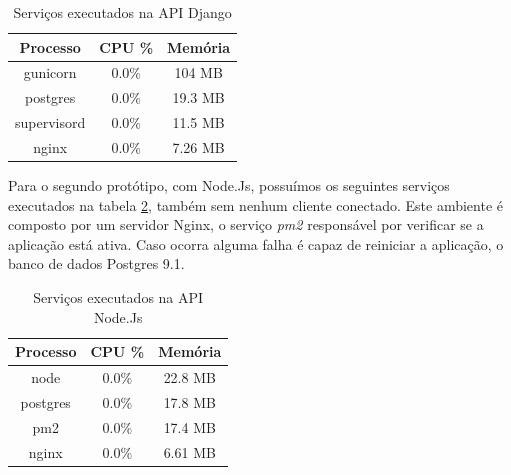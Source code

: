   \begin{table}[h]
    \centering
    \footnotesize
    \setlength{\abovecaptionskip}{0pt}
    \setlength{\belowcaptionskip}{0pt}
    \caption[Serviços executados na API Django]{Serviços executados na API Django}
    \label{tab:services-in-api-django}
    \begin{tabular}{c|c|c}
      \hline \hline
      Processo  & 	CPU \% &	Memória \\
      \hline \hline
      gunicorn &	0.0\% &		104 MB \\
      postgres &	0.0\% &		19.3 MB \\
      supervisord &	0.0\% &		11.5 MB \\
      nginx &		0.0\% &		7.26 MB \\
      \hline \hline
    \end{tabular}
  \end{table}

  Para o segundo protótipo, com Node.Js, possuímos os seguintes serviços executados na tabela \ref{tab:services-in-api-node},
  também sem nenhum cliente conectado. Este ambiente é composto por um servidor Nginx, o serviço \textit{pm2} responsável por
  verificar se a aplicação está ativa. Caso ocorra alguma falha é capaz de reiniciar a aplicação,
  o banco de dados Postgres 9.1.

   \begin{table}[H]
    \centering
    \footnotesize
    \setlength{\abovecaptionskip}{0pt}
    \setlength{\belowcaptionskip}{0pt}
    \caption[Serviços executados na API Node]{Serviços executados na API Node.Js}
    \label{tab:services-in-api-node}
    \begin{tabular}{c|c|c}
      \hline \hline
      Processo  & 	CPU \% &	Memória \\
      \hline \hline
      node &		0.0\% &		22.8 MB \\
      postgres &	0.0\% &		17.8 MB \\
      pm2 &		0.0\% &		17.4 MB \\
      nginx &		0.0\% &		6.61 MB \\
      \hline \hline
    \end{tabular}
  \end{table}

